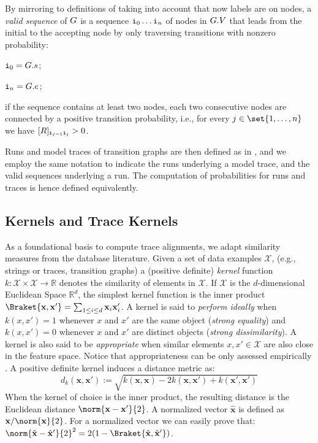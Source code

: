 By mirroring to definitions of  taking into account that now labels are on nodes, a \emph{valid sequence} of $G$ is a sequence $\textnormal{\texttt{i}}_0\ldots\textnormal{\texttt{i}}_n$ of nodes in $G.V$ that leads from the initial to the accepting node by only traversing transitions with nonzero probability:
\begin{inparaenum}[\it (i)]
\item $\textnormal{\texttt{i}}_0 = G.s$;
\item $\textnormal{\texttt{i}}_n = G.e$;
\item if the sequence contains at least two nodes, each two consecutive nodes are connected by a positive transition probability, i.e., for every $j \in \set{1,\ldots,n}$ we have $[R]_{\textnormal{\texttt{i}}_{j-1}\textnormal{\texttt{i}}_{j}} > 0$.
\end{inparaenum}
Runs and model traces of transition graphs are then defined as in , and we employ the same notation to indicate the runs underlying a model trace, and the valid sequences underlying a run. The computation of probabilities for runs and traces is hence defined equivalently.

\subsection{Kernels and Trace Kernels}\label{subsec:katk}
As a foundational basis to compute trace alignments, we adapt similarity measures from the database literature.  Given a set of data examples $\mathcal{X}$, (e.g., strings or traces, transition graphs) a (positive definite) \emph{kernel} function $k\colon \mathcal{X}\times \mathcal{X}\to \mathbb{R}$ denotes the similarity of elements in $\mathcal{X}$. If $\mathcal{X}$ is the $d$-dimensional Euclidean Space $\mathbb{R}^d$, the simplest kernel function is the inner product $\Braket{\mathbf{x},\mathbf{x}'}=\sum_{1\leq i\leq d}\mathbf{x}_i\mathbf{x}'_i$.
A kernel is said to \emph{perform ideally} \cite{Gartner03} when $k(x,x')=1$ whenever $x$ and $x'$ are the same object (\textit{strong equality}) and $k(x,x')=0$ whenever $x$ and $x'$ are distinct objects (\textit{strong dissimilarity}). A kernel is also said to be \emph{appropriate} when similar elements $x,x'\in\mathcal{X}$ are also close in the feature space. Notice that appropriateness can be only assessed  empirically \cite{Gartner03}.
A positive definite kernel induces a distance metric as:
\begin{equation}\label{eq:dofk}
d_k(\mathbf{x},\mathbf{x}'):=\sqrt{k(\mathbf{x},\mathbf{x})-2k(\mathbf{x},\mathbf{x}')+k(\mathbf{x}',\mathbf{x}')}
\end{equation}
When the kernel of choice is the inner product, the resulting distance is the Euclidean distance $\norm{\mathbf{x}-\mathbf{x}'}{2}$. A normalized vector $\hat{\mathbf{x}}$ is defined as $\mathbf{x}/\norm{\mathbf{x}}{2}$. For a normalized vector we can easily prove that: $\norm{\hat{\mathbf{x}}-\hat{\mathbf{x}}'}{2}^2=2(1-\Braket{\hat{\mathbf{x}},\hat{\mathbf{x}}'})$.

